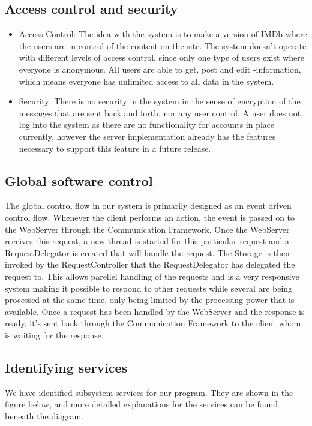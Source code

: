 \subsection{Access control and security}
\begin{itemize}
\item Access Control: The idea with the system is to make a version of IMDb where the users are in control of the content on the site. The system doesn't operate with different levels of access control, since only one type of users exist where everyone is anonymous. All users are able to get, post and edit -information, which means everyone has unlimited access to all data in the system.\\
\item Security: There is no security in the system in the sense of encryption of the messages that are sent back and forth, nor any user control. A user does not log into the system as there are no functionality for accounts in place currently, however the server implementation already has the features necessary to support this feature in a future release.
\end{itemize}

\subsection{Global software control}
The global control flow in our system is primarily designed as an event driven control flow. Whenever the client performs an action, the event is passed on to the WebServer through the Communication Framework. Once the WebServer receives this request, a new thread is started for this particular request and a RequestDelegator is created that will handle the request. The Storage is then invoked by the RequestController that the RequestDelegator has delegated the request to. This allows parellel handling of the requests and is a very responsive system making it possible to respond to other requests while several are being processed at the same time, only being limited by the processing power that is available. Once a request has been handled by the WebServer and the response is ready, it's sent back through the Communication Framework to the client whom is waiting for the response. 

\subsection{Identifying services}
We have identified subsystem services for our program. They are shown in the figure below, and more detailed explanations for the services can be found beneath the diagram.

